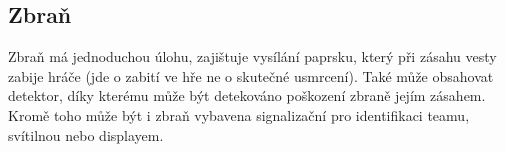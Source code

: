 \subsection{Zbraň}
Zbraň má jednoduchou úlohu, zajištuje vysílání  paprsku, který při zásahu vesty zabije hráče (jde o zabití ve hře ne o skutečné usmrcení). Také může obsahovat  detektor, díky kterému může být detekováno poškození zbraně jejím zásahem. Kromě toho může být i zbraň vybavena signalizační  pro identifikaci teamu, svítilnou nebo displayem.
